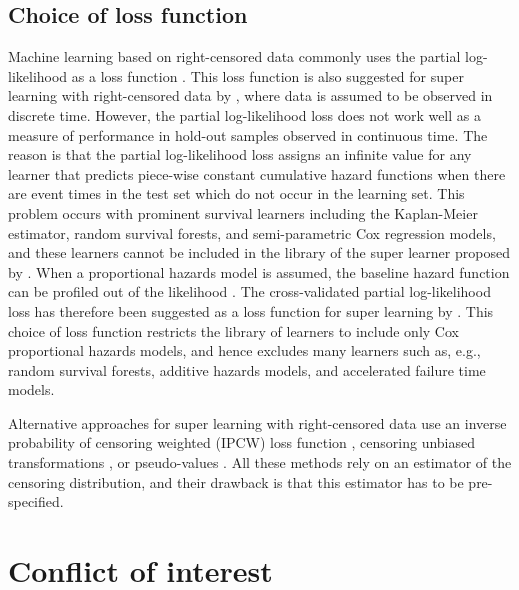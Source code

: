 \documentclass[a4paper,danish]{article}
\theoremstyle{plain} %
\numberwithin{theorem}{section}
\theoremstyle{definition} %
\theoremstyle{remark}
\newcommand{\1}{\mathds{1}}
\begin{document}
\subsection{Choice of loss function}
\label{sec:choice-of-loss-function}

Machine learning based on right-censored data
commonly uses the partial log-likelihood as a loss function
\citep[e.g.,][]{li2016regularized,yao2017deep,lee2018deephit,katzman2018deepsurv,gensheimer2019scalable,lee2021boosted,kvamme2021continuous}.
This loss function is also suggested for super learning with
right-censored data by \cite{polley2011-sl-cens}, where data is
assumed to be observed in discrete time. However, the partial
log-likelihood loss does not work well as a measure of performance in
hold-out samples observed in continuous time.  The reason is that the
partial log-likelihood loss assigns an infinite value for any learner
that predicts piece-wise constant cumulative hazard functions when
there are event times in the test set which do not occur in the
learning set.  This problem occurs with prominent survival learners
including the Kaplan-Meier estimator, random survival forests, and
semi-parametric Cox regression models, and these learners cannot be
included in the library of the super learner proposed by
\cite{polley2011-sl-cens}. When a proportional hazards model is
assumed, the baseline hazard function can be profiled out of the
likelihood \citep{cox1972regression}. The cross-validated partial
log-likelihood loss \citep{verweij1993cross} has therefore been
suggested as a loss function for super learning by
\cite{golmakani2020super}.  This choice of loss function restricts the
library of learners to include only Cox proportional hazards models,
and hence excludes many learners such as, e.g., random survival
forests, additive hazards models, and accelerated failure time models.

Alternative approaches for super learning with right-censored
data use an inverse probability of censoring weighted (IPCW)
loss function
\citep{graf1999assessment,van2003unicv,molinaro2004tree,keles2004asymptotically,hothorn2006survival,gerds2006consistent,gonzalez2021stacked},
censoring unbiased transformations
\citep{fan1996local,steingrimsson2019censoring}, or
pseudo-values
\citep{andersen2003generalised,mogensen2013random,sachs2019ensemble}.
All these methods rely on an estimator of the censoring
distribution, and their drawback is that this estimator has to
be pre-specified.

\section*{Conflict of interest}
\end{document}
